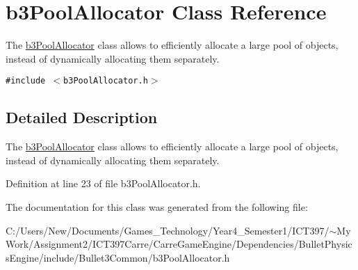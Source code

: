 \hypertarget{classb3_pool_allocator}{
\section{b3PoolAllocator Class Reference}
\label{classb3_pool_allocator}
}
The \hyperlink{classb3_pool_allocator}{b3PoolAllocator} class allows to efficiently allocate a large pool of objects, instead of dynamically allocating them separately.  


{\tt \#include $<$b3PoolAllocator.h$>$}



\subsection{Detailed Description}
The \hyperlink{classb3_pool_allocator}{b3PoolAllocator} class allows to efficiently allocate a large pool of objects, instead of dynamically allocating them separately. 

Definition at line 23 of file b3PoolAllocator.h.

The documentation for this class was generated from the following file:\begin{CompactItemize}
\item 
C:/Users/New/Documents/Games\_\-Technology/Year4\_\-Semester1/ICT397/$\sim$My Work/Assignment2/ICT397Carre/CarreGameEngine/Dependencies/BulletPhysicsEngine/include/Bullet3Common/b3PoolAllocator.h\end{CompactItemize}
